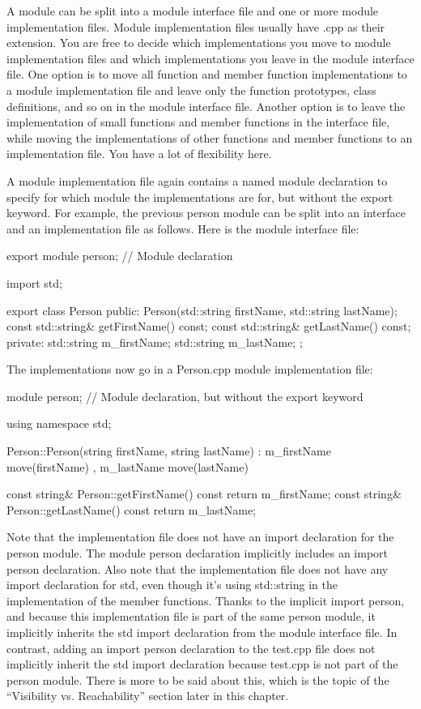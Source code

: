 
A module can be split into a module interface file and one or more module implementation files.
Module implementation files usually have .cpp as their extension. You are free to decide which implementations you move to module implementation files and which implementations you leave in the module interface file. One option is to move all function and member function implementations to a module implementation file and leave only the function prototypes, class definitions, and so on in the module interface file. Another option is to leave the implementation of small functions and member functions in the interface file, while moving the implementations of other functions and member functions to an implementation file. You have a lot of flexibility here.

A module implementation file again contains a named module declaration to specify for which module the implementations are for, but without the export keyword. For example, the previous person module can be split into an interface and an implementation file as follows. Here is the module interface file:

\begin{cpp}
export module person; // Module declaration

import std;

export class Person
{
    public:
        Person(std::string firstName, std::string lastName);
        const std::string& getFirstName() const;
        const std::string& getLastName() const;
    private:
        std::string m_firstName;
        std::string m_lastName;
};
\end{cpp}

The implementations now go in a Person.cpp module implementation file:

\begin{cpp}
module person; // Module declaration, but without the export keyword

using namespace std;

Person::Person(string firstName, string lastName)
: m_firstName { move(firstName) }, m_lastName { move(lastName) }
{}

const string& Person::getFirstName() const { return m_firstName; }
const string& Person::getLastName() const { return m_lastName; }
\end{cpp}

Note that the implementation file does not have an import declaration for the person module. The module person declaration implicitly includes an import person declaration. Also note that the implementation file does not have any import declaration for std, even though it’s using std::string in the implementation of the member functions. Thanks to the implicit import person, and because this implementation file is part of the same person module, it implicitly inherits the std import declaration from the module interface file. In contrast, adding an import person declaration to the test.cpp file does not implicitly inherit the std import declaration because test.cpp is not part of the person module. There is more to be said about this, which is the topic of the “Visibility vs. Reachability” section later in this chapter.

